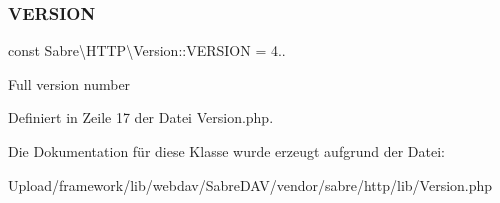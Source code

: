 \subsubsection{\texorpdfstring{V\+E\+R\+S\+I\+ON}{VERSION}}
{\footnotesize\ttfamily const Sabre\textbackslash{}\+H\+T\+T\+P\textbackslash{}\+Version\+::\+V\+E\+R\+S\+I\+ON = \textquotesingle{}4..\textquotesingle{}}

Full version number 

Definiert in Zeile 17 der Datei Version.\+php.



Die Dokumentation für diese Klasse wurde erzeugt aufgrund der Datei\+:\begin{DoxyCompactItemize}
\item 
Upload/framework/lib/webdav/\+Sabre\+D\+A\+V/vendor/sabre/http/lib/Version.\+php\end{DoxyCompactItemize}
